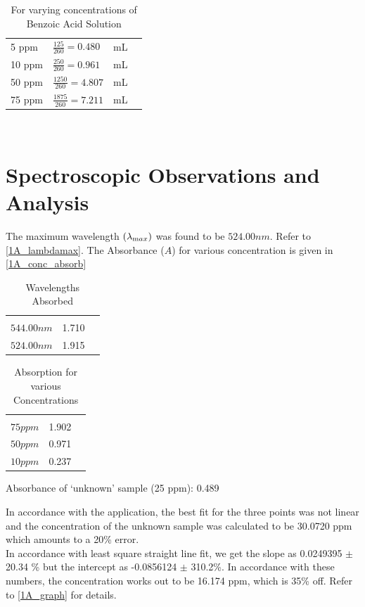 	\begin{table}
		\myfloatalign
		\begin{tabularx}{\textwidth}{Xlll}
			\hline%
			5 ppm 	&	$\frac{125}{260}=0.480$	&	mL\\
			10 ppm 	&	$\frac{250}{260}=0.961$	&	mL\\
			50 ppm 	&	$\frac{1250}{260}=4.807$	&	mL\\
			75 ppm 	&	$\frac{1875}{260}=7.211$	&	mL\\ \hline%
		\end{tabularx}\\
		\caption{For varying concentrations of Benzoic Acid Solution}
		\label{1A_vary}
	\end{table}

\section{Spectroscopic Observations and Analysis}
	The maximum wavelength $(\lambda_{\text max})$ was found to be $524.00 nm$. Refer to \autoref{1A_lambdamax}. The Absorbance ($A$) for various concentration is given in \autoref{1A_conc_absorb}
	\begin{table}
		\myfloatalign
		\begin{tabularx}{\textwidth}{Xll}
			\hline
			\tableheadline{Wavelength $(\lambda)$} 	&	\tableheadline{Absorbance}\\
			$544.00 nm$								&	1.710\\
			$524.00 nm$								&	1.915\\		
			\hline
		\end{tabularx}
		\caption{Wavelengths Absorbed}
		\label{1A_lambdamax}
	\end{table}

	\begin{table}
		\myfloatalign
		\begin{tabularx}{\textwidth}{Xll}
			\hline
			\tableheadline{Concentration $(c)$} 	&	\tableheadline{Absorbance}\\
			$75 ppm$								&	1.902\\
			$50 ppm$								&	0.971\\
			$10 ppm$								&	0.237\\
			\hline
		\end{tabularx}
		\caption{Absorption for various Concentrations}
		\label{1A_conc_absorb}
	\end{table}
	Absorbance of `unknown' sample (25 ppm): 0.489
	\par
	In accordance with the application, the best fit for the three points was not linear and the concentration of the unknown sample was calculated to be 30.0720 ppm which amounts to a 20\% error.\\
	In accordance with least square straight line fit, we get the slope as 0.0249395 $\pm$ 20.34 \% but the intercept as -0.0856124 $\pm$ 310.2\%. In accordance with these numbers, the concentration works out to be 16.174 ppm, which is 35\% off. Refer to \autoref{1A_graph} for details. 

